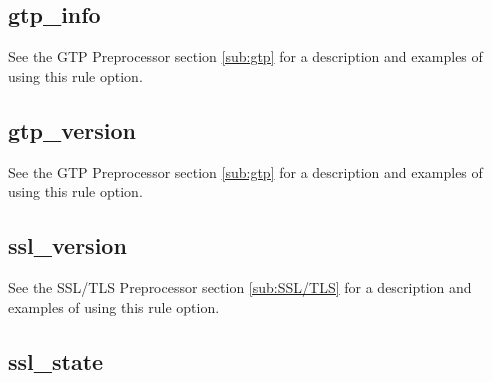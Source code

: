 \documentclass[english]{report}
\begin{document}
\subsection{gtp\_info}

See the GTP Preprocessor section \ref{sub:gtp} for a description and
examples of using this rule option.

\subsection{gtp\_version}

See the GTP Preprocessor section \ref{sub:gtp} for a description and
examples of using this rule option.

%

%
%
%
%

\subsection{ssl\_version}

See the SSL/TLS Preprocessor section \ref{sub:SSL/TLS} for a description and examples of
using this rule option.

\subsection{ssl\_state}
\end{document}
